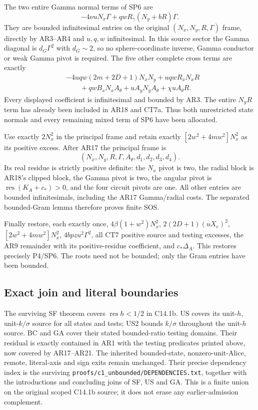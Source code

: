 The two entire Gamma normal terms of SP6 are
\[
 -4\nu uN_x\Gamma
          +qwR_\gamma(N_y+bR)\Gamma.
 \tag{AR19}
\]
They are bounded infinitesimal entries on the original
$(N_x,N_y,R,\Gamma)$ frame, directly by AR3--AR4 and
$u,q,w$ infinitesimal. In this source sector the Gamma diagonal
is $d_G\Gamma^2$ with $d_G\sim2$, so no sphere-coordinate
inverse, Gamma conductor or weak Gamma pivot is required.
The five other complete cross terms are exactly
\[
 \begin{split}
 &-4uqw(2m+2D+1)N_xN_y+uqwR_xN_xR\\
 &\qquad+qwB_xN_xA_\theta+uA_yN_yA_\theta
                                      +\chi uA_\theta R.
 \end{split} \tag{AR20}
\]
Every displayed coefficient is infinitesimal and bounded by
AR3. The entire $N_yR$ term has already been included in
AR18 and CT7a. Thus both unrestricted state normals and every
remaining mixed term of SP6 have been allocated.

Use exactly $2N_x^2$ in the principal frame and retain exactly
$[2w^2+4mw^2]N_x^2$ as its positive excess. After AR17 the
principal frame is
\[
          (N_x,N_y,R,\Gamma,A_\theta,d_1,d_2,d_3,d_4).
 \tag{AR21}
\]
Its real residue is strictly positive definite: the $N_x$ pivot
is two, the radial block is AR18's clipped block, the Gamma
pivot is two, the angular pivot is $\operatorname{res}(K_A+c_*)>0$,
and the four circuit pivots are one. All other entries are
bounded infinitesimals, including the AR17 Gamma/radial costs.
The separated bounded-Gram lemma therefore proves finite SOS.

Finally restore, each exactly once, $4\beta(1+w^2)N_x^2$,
$2(2D+1)(uX_e)^2$, $[2w^2+4mw^2]N_x^2$,
$4bpzu^2\Gamma^2$, all CT7 positive source and testing
excesses, the AR9 remainder with its positive-residue coefficient,
and $c_*\Delta_A$. This restores precisely P4/SP6. The roots
need not be bounded; only the Gram entries have been bounded.

\subsection{Exact join and literal boundaries}

The surviving SF theorem covers $\operatorname{res}h<1/2$ in
C14.1b. US covers its unit-$h$, unit-$k/\sigma$ source for
all states and tests; US2 bounds $k/\sigma$ throughout the
unit-$h$ source. BC and GA cover their stated bounded-ratio
testing domains. Their residual is exactly contained in AR1
with the testing predicates printed above, now covered by
AR17--AR21. The inherited bounded-state, nonzero-unit-Alice,
remote, literal-axis and sign exits remain unchanged. Their
precise dependency index is the surviving
\texttt{proofs/c1\_unbounded/DEPENDENCIES.txt}, together with
the introductions and concluding joins of SF, US and GA.
This is a finite union on the original scoped C14.1b source;
it does not erase any earlier-admission complement.

